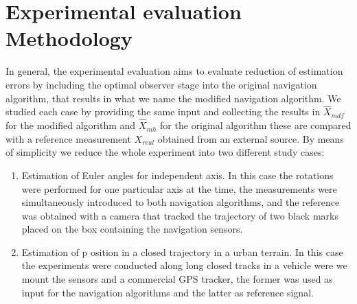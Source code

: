 \documentclass[10pt,conference]{IEEEtran}
\begin{document}
\section{Experimental evaluation Methodology}\label{Metodologia}
In general, the experimental evaluation aims to evaluate reduction of estimation errors by including the optimal observer stage into the original navigation algorithm, that results in what we name the modified navigation algorithm. We studied each case by providing the same input and collecting the results in $\hat{X}_{mdf}$ for the modified algorithm and  $\hat{X}_{mh}$ for the original algorithm these are compared with a reference measurement $X_{real}$ obtained from an external source.
By means of simplicity we reduce the whole experiment into two different study cases: 
\begin{enumerate}[\IEEEsetlabelwidth{8)}]
\item Estimation of Euler angles for independent axis. In this case the rotations were performed for one particular axis at the time, the measurements were simultaneously introduced to both navigation algorithms, and the reference was obtained with a camera that tracked the trajectory of two black marks placed on the box containing the navigation sensors.
\item Estimation of p
osition in a closed trajectory in a urban terrain. In this case the experiments were conducted along long closed tracks in a vehicle were we mount the sensors and a commercial GPS tracker, the former was used as input for the navigation algorithms and the latter as reference signal.
\end{enumerate}
\end{document}
